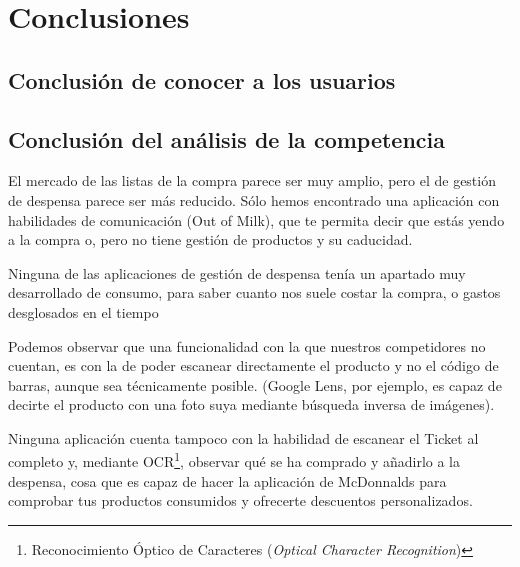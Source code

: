\chapter{Conclusiones}
\section{Conclusión de conocer a los usuarios}
\section{Conclusión del análisis de la competencia}

El mercado de las listas de la compra parece ser muy amplio, pero el de gestión de despensa parece ser más reducido. Sólo hemos encontrado una aplicación con habilidades de comunicación (Out of Milk), que te permita decir que estás yendo a la compra o, pero no tiene gestión de productos y su caducidad.

Ninguna de las aplicaciones de gestión de despensa tenía un apartado muy desarrollado de consumo, para saber cuanto nos suele costar la compra, o gastos desglosados en el tiempo

Podemos observar que una funcionalidad con la que nuestros competidores no cuentan, es con la de poder escanear directamente el producto y no el código de barras, aunque sea técnicamente posible. (Google Lens, por ejemplo, es capaz de decirte el producto con una foto suya mediante búsqueda inversa de imágenes).

Ninguna aplicación cuenta tampoco con la habilidad de escanear el Ticket al completo y, mediante OCR\footnote{Reconocimiento Óptico de Caracteres (\textit{Optical Character Recognition})}, observar qué se ha comprado y añadirlo a la despensa, cosa que es capaz de hacer la aplicación de McDonnalds para comprobar tus productos consumidos y ofrecerte descuentos personalizados.